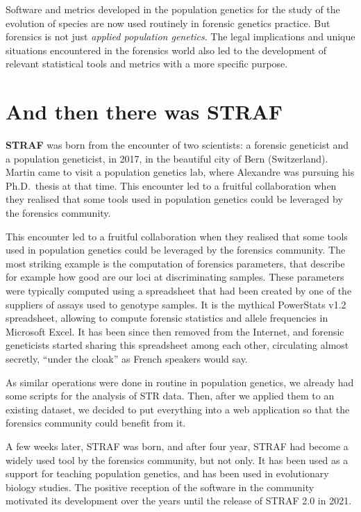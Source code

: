 \documentclass[
]{book}
\begin{document}
Software and metrics developed in the population genetics for the study of the
evolution of species are now used routinely in forensic genetics practice.
But forensics is not just \emph{applied population genetics}. The legal implications
and unique situations encountered in the forensics world also led to the
development of relevant statistical tools and metrics with a more specific purpose.

\hypertarget{and-then-there-was-straf}{%
\section*{And then there was STRAF}\label{and-then-there-was-straf}}

\textbf{STRAF} was born from the encounter of two scientists: a forensic geneticist and a
population geneticist, in 2017, in the beautiful city of Bern (Switzerland).
Martin came to visit a population genetics lab, where Alexandre was pursuing
his Ph.D.~thesis at that time. This encounter led to a fruitful collaboration
when they realised that some tools used in population genetics could be
leveraged by the forensics community.

This encounter led to a fruitful collaboration when they realised that some tools
used in population genetics could be leveraged by the forensics community. The
most striking example is the computation of forensics parameters, that describe
for example how good are our loci at discriminating samples. These
parameters were typically computed using a spreadsheet that had been created by
one of the suppliers of assays used to genotype samples. It is the mythical
PowerStats v1.2 spreadsheet, allowing to compute forensic statistics and allele
frequencies in Microsoft Excel. It has been since then removed from the Internet,
and forensic geneticists started sharing this spreadsheet among each other, circulating
almost secretly, ``under the cloak'' as French speakers would say.

As similar operations were done in routine in population genetics, we already had
some scripts for the analysis of STR data. Then, after we applied them to an existing
dataset, we decided to put everything into a web application so that the forensics
community could benefit from it.

A few weeks later, STRAF was born, and after four year, STRAF had become a
widely used tool by the forensics community, but not only.
It has been used as a support for teaching population genetics, and has
been used in evolutionary biology studies.
The positive reception of the software in the community motivated its
development over the years until the release of STRAF 2.0 in 2021.
\end{document}
